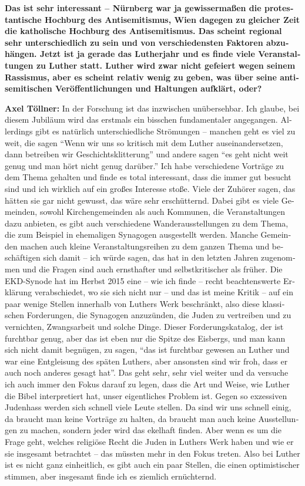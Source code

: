 \begin{otherlanguage}{ngerman}
\textbf{Das ist sehr interessant – Nürnberg war ja gewissermaßen die protestantische Hochburg des Antisemitismus, Wien dagegen zu gleicher Zeit die katholische Hochburg des Antisemitismus. Das scheint regional sehr unterschiedlich zu sein und von verschiedensten Faktoren abzuhängen. 
Jetzt ist ja gerade das Lutherjahr und es finde viele Veranstaltungen zu Luther statt. Luther wird zwar nicht gefeiert wegen seinem Rassismus, aber es scheint relativ wenig zu geben, was über seine antisemitischen Veröffentlichungen und Haltungen aufklärt, oder?} 

\textbf{Axel Töllner:} In der Forschung ist das inzwischen unübersehbar. Ich glaube, bei diesem Jubiläum wird das erstmals ein bisschen fundamentaler angegangen. Allerdings gibt es natürlich unterschiedliche Strömungen – manchen geht es viel zu weit, die sagen "`Wenn wir uns so kritisch mit dem Luther auseinandersetzen, dann betreiben wir Geschichtsklitterung"' und andere sagen "`es geht nicht weit genug und man hört nicht genug darüber."' Ich habe verschiedene Vorträge zu dem Thema gehalten und finde es total interessant, dass die immer gut besucht sind und ich wirklich auf ein großes Interesse stoße. Viele der Zuhörer sagen, das hätten sie gar nicht gewusst, das wäre sehr erschütternd. Dabei gibt es viele Gemeinden, sowohl Kirchengemeinden als auch Kommunen, die Veranstaltungen dazu anbieten, es gibt auch verschiedene Wanderausstellungen zu dem Thema, die zum Beispiel in ehemaligen Synagogen ausgestellt werden. Manche Gemeinden machen auch kleine Veranstaltungsreihen zu dem ganzen Thema und beschäftigen sich damit – ich würde sagen, das hat in den letzten Jahren zugenommen und die Fragen sind auch ernsthafter und selbstkritischer als früher.  
Die EKD-Synode hat im Herbst 2015 eine – wie ich finde – recht beachtenswerte Erklärung verabschiedet, wo sie sich nicht nur – und das ist meine Kritik – auf ein paar wenige Stellen innerhalb von Luthers Werk beschränkt, also diese klassischen Forderungen, die Synagogen anzuzünden, die Juden zu vertreiben und zu vernichten, Zwangsarbeit und solche Dinge. Dieser Forderungskatalog, der ist furchtbar genug, aber das ist eben nur die Spitze des Eisbergs, und man kann sich nicht damit begnügen, zu sagen, "`das ist furchtbar gewesen an Luther und war eine Entgleisung des späten Luthers, aber ansonsten sind wir froh, dass er auch noch anderes gesagt hat"'. Das geht sehr, sehr viel weiter und da versuche ich auch immer den Fokus darauf zu legen, dass die Art und Weise, wie Luther die Bibel interpretiert hat, unser eigentliches Problem ist. 
Gegen so exzessiven Judenhass werden sich schnell viele Leute stellen. Da sind wir uns schnell einig, da braucht man keine Vorträge zu halten, da braucht man auch keine Ausstellungen zu machen, sondern jeder wird das ekelhaft finden. Aber wenn es um die Frage geht, welches religiöse Recht die Juden in Luthers Werk haben und wie er sie insgesamt betrachtet – das müssten mehr in den Fokus treten. Also bei Luther ist es nicht ganz einheitlich, es gibt auch ein paar Stellen, die einen optimistischer stimmen, aber insgesamt finde ich es ziemlich ernüchternd. 
 

\end{otherlanguage}
